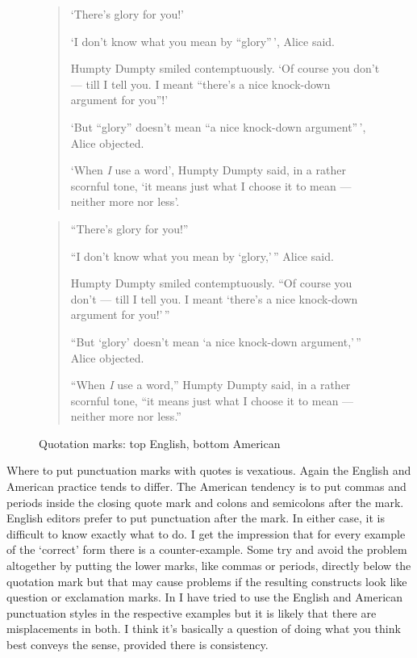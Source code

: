 \documentclass[10pt,a4paper,oneside,extrafontsizes]{memoir}%
\begin{document}
\begin{figure}
\centering
\begin{minipage}{\textwidth}
\mbox{}\hrulefill\mbox{}
\begin{quotation}
    `There's glory for you!' 

    `I don't know what you mean by ``glory''\,', Alice said. 

    Humpty Dumpty smiled contemptuously. `Of course you don't --- till I tell
you. I meant ``there's a nice knock-down argument for you''!' 

    `But ``glory'' doesn't mean ``a nice knock-down argument''\,', Alice
objected. 

    `When \emph{I} use a word', Humpty Dumpty said, in a rather scornful
tone, `it means just what I choose it to mean --- neither more nor less'.
\end{quotation}
\mbox{}\hrulefill\mbox{}
\begin{quotation}
     ``There's glory for you!'' 

    ``I don't know what you mean by `glory,'\,'' Alice said. 

    Humpty Dumpty smiled contemptuously. ``Of course you don't --- till I tell
you. I meant `there's a nice knock-down argument for you!'\,'' 

    ``But `glory' doesn't mean `a nice knock-down argument,'\,'' Alice
objected. 

    ``When \emph{I} use a word,'' Humpty Dumpty said, in a rather scornful
tone, ``it means just what I choose it to mean --- neither more nor less.''
\end{quotation}
\mbox{}\hrulefill\mbox{}
\end{minipage}
\caption{Quotation marks: top English, bottom American}\label{fig:qmarks}
\end{figure}

\begin{paracol}{2}
\switchEng
    Where to put punctuation marks with quotes is vexatious. Again the
English and American practice tends to differ. The American tendency is
to put commas and periods inside the closing quote mark and colons and
semicolons after the mark. English editors prefer to put punctuation
after the mark.
In either case, it is difficult
to know exactly what to do. I get the impression that for every example
of the `correct' form there is a counter-example.
Some try and avoid the problem altogether by putting the lower marks, 
like commas or periods, 
directly below the quotation mark but that may cause problems if the 
resulting constructs look like question or exclamation marks. 
In  I have tried to use the English and American 
punctuation styles in the respective examples but it is likely that there
are misplacements in both. I think it's basically a question of doing what
you think best conveys the sense, provided there is consistency.
\end{paracol}
\end{document}
